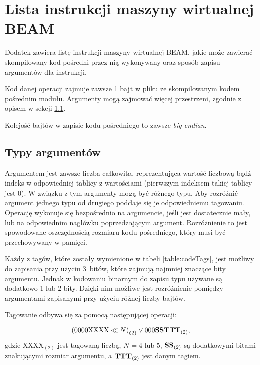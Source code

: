 \chapter{Lista instrukcji maszyny wirtualnej BEAM}
\label{cha:operacjeBeam}

Dodatek zawiera listę instrukcji maszyny wirtualnej BEAM, jakie może zawierać skompilowany kod pośredni przez nią wykonywany oraz sposób zapisu argumentów dla instrukcji.

Kod danej operacji zajmuje zawsze 1 bajt w pliku ze skompilowanym kodem pośrednim modułu. 
Argumenty mogą zajmować więcej przestrzeni, zgodnie z opisem w sekcji \ref{sec:opsTypes}.

Kolejość bajtów w zapisie kodu pośredniego to zawsze \emph{big endian}.


\section{Typy argumentów}
\label{sec:opsTypes}
Argumentem jest zawsze liczba całkowita, reprezentująca wartość liczbową bądź indeks w odpowiedniej tablicy z wartościami (pierwszym indeksem takiej tablicy jest 0). W związku z tym argumenty mogą być różnego typu. Aby rozróżnić argument jednego typu od drugiego poddaje się je odpowiedniemu tagowaniu. Operację wykonuje się bezpośrednio na argumencie, jeśli jest dostatecznie mały, lub na odpowiednim nagłówku poprzedzającym argument. Rozróżnienie to jest spowodowane oszczędnością rozmiaru kodu pośredniego, który musi być przechowywany w pamięci.

Każdy z tagów, które zostały wymienione w tabeli \ref{table:codeTags}, jest możliwy do zapisania przy użyciu 3~bitów, które zajmują najmniej znaczące bity argumentu.
Jednak w kodowaniu binarnym do zapisu typu używane są dodatkowo 1 lub 2 bity. Dzięki nim możliwe jest rozróżnienie pomiędzy argumentami zapisanymi przy użyciu różnej liczby bajtów.

Tagowanie odbywa się za pomocą następującej operacji:

$${(0000\text{XXXX} \ll N)}_{(2)} \vee {000\text{\textbf{SS}}\text{\textbf{TTT}}}_{(2)},$$
gdzie $\text{XXXX}_{(2)}$ jest tagowaną liczbą, 
$N=4 \text{ lub } 5$, 
$\text{\textbf{SS}}_{(2)}$ są dodatkowymi bitami znakującymi rozmiar argumentu, a
$\text{\textbf{TTT}}_{(2)}$ jest danym tagiem.

